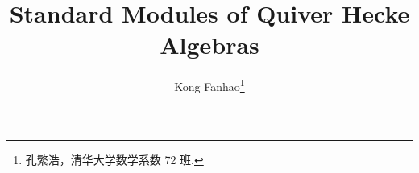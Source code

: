 \documentclass[twoside]{article}
\begin{document}
\title{Standard Modules of Quiver Hecke Algebras}
\author{Kong Fanhao\footnote{孔繁浩，清华大学数学系数 72 班.}}



\tableofcontents



\printbibliography       %
\end{document}
